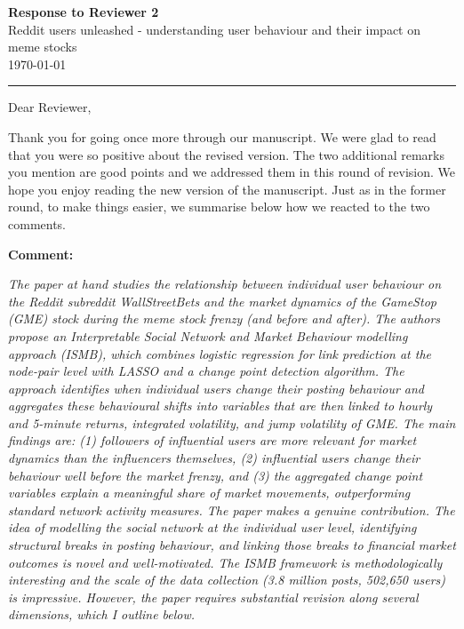 \documentclass[11pt]{article}
\newcommand{\reviewercomment}[1]{\begin{commentbox}\textit{#1}\end{commentbox}}
\begin{document}
\begin{center}
  {\Large \textbf{Response to Reviewer 2}}\\[0.5em]
  {\large Reddit users unleashed - understanding user behaviour and
  	their impact on meme stocks}\\[0.3em]
  {\small \today}
\end{center}

\vspace{1em}\hrule\vspace{1.5em}

Dear Reviewer,

Thank you for going once more through our manuscript. We were glad to read that you were so positive about the revised version. The two additional remarks you mention are good points and we addressed them in this round of revision. We hope you enjoy reading the new version of the manuscript. Just as in the former round, to make things easier, we summarise below how we reacted to the two comments.

\bigskip

\textbf{Comment:}

\reviewercomment{%
	The paper at hand studies the relationship between individual user behaviour on the Reddit subreddit WallStreetBets and the market dynamics of the GameStop (GME) stock during the meme stock frenzy (and before and after). The authors propose an Interpretable Social Network and Market Behaviour modelling approach (ISMB), which combines logistic
	regression for link prediction at the node-pair level with LASSO and a change point detection algorithm. The approach identifies when individual users change their posting
	behaviour and aggregates these behavioural shifts into variables that are then linked to hourly and 5-minute returns, integrated volatility, and jump volatility of GME. The main findings are: (1) followers of influential users are more relevant for market dynamics than the influencers themselves, (2) influential users change their behaviour well before the market frenzy, and (3) the aggregated change point variables explain a meaningful share of market movements, outperforming standard network activity measures. The paper makes a genuine contribution. The idea of modelling the social network at the individual user level, identifying structural breaks in posting behaviour, and linking those breaks to financial market outcomes is novel and well-motivated. The ISMB framework is methodologically interesting and the scale of the data collection (3.8 million posts, 502,650 users) is impressive. However, the paper requires substantial revision along several dimensions, which I outline below.
}
\end{document}
